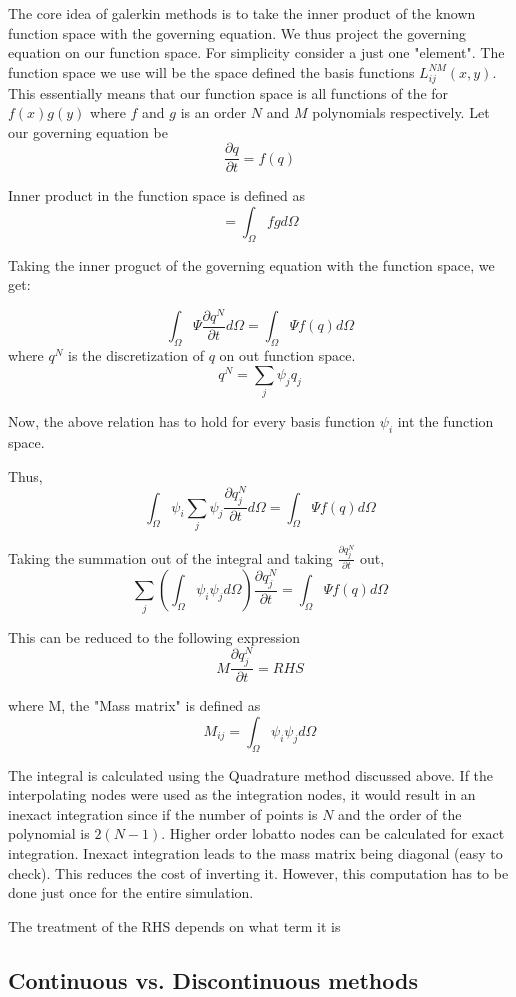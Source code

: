 \documentclass[11pt]{article}
\begin{document}
The core idea of galerkin methods is to take the inner product of the
known function space with the governing equation. We thus project the
governing equation on our function space. For simplicity consider a just
one "element". The function space we use will be the space defined the
basis functions \(L^{NM}_{ij}(x,y)\). This essentially means that our
function space is all functions of the for \(f(x)g(y)\) where \(f\) and
\(g\) is an order \(N\) and \(M\) polynomials respectively. Let our
governing equation be \[\frac{\partial q}{\partial t} = f(q)\]

Inner product in the function space is defined as
\[<f,g> = \int_{\Omega} fg d\Omega\]

Taking the inner proguct of the governing equation with the function
space, we get:

\[\int_{\Omega}\Psi \frac{\partial q^N}{\partial t}d\Omega = \int_{\Omega}\Psi f(q) d\Omega\]
where \(q^N\) is the discretization of \(q\) on out function space.
\[q^N = \sum_j \psi_j q_j\]

Now, the above relation has to hold for every basis function \(\psi_i\)
int the function space.

Thus,
\[\int_{\Omega}\psi_i \sum_j \psi_j \frac{\partial q_j^N}{\partial t}d\Omega = \int_{\Omega}\Psi f(q) d\Omega\]

Taking the summation out of the integral and taking
\(\frac{\partial q_j^N}{\partial t}\) out,
\[ \sum_j (\int_{\Omega}\psi_i \psi_j d\Omega) \frac{\partial q_j^N}{\partial t} = \int_{\Omega}\Psi f(q) d\Omega\]

This can be reduced to the following expression
\[M \frac{\partial q_j^N}{\partial t} = RHS\]

where M, the "Mass matrix" is defined as
\[M_{ij} = \int_{\Omega}\psi_i \psi_j d\Omega\]

The integral is calculated using the Quadrature method discussed above.
If the interpolating nodes were used as the integration nodes, it would
result in an inexact integration since if the number of points is \(N\)
and the order of the polynomial is \(2(N-1)\). Higher order lobatto
nodes can be calculated for exact integration. Inexact integration leads
to the mass matrix being diagonal (easy to check). This reduces the cost
of inverting it. However, this computation has to be done just once for
the entire simulation.

The treatment of the RHS depends on what term it is

\subsection{Continuous vs. Discontinuous
methods}\label{continuous-vs.-discontinuous-methods}
\end{document}
